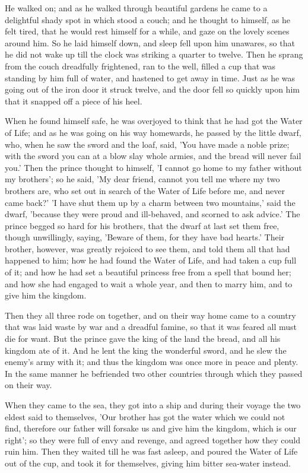 \documentclass[12pt]{book}
\begin{document}
He walked on; and as he walked through beautiful gardens he came to a
delightful shady spot in which stood a couch; and he thought to
himself, as he felt tired, that he would rest himself for a while, and
gaze on the lovely scenes around him. So he laid himself down, and
sleep fell upon him unawares, so that he did not wake up till the
clock was striking a quarter to twelve. Then he sprang from the couch
dreadfully frightened, ran to the well, filled a cup that was standing
by him full of water, and hastened to get away in time. Just as he was
going out of the iron door it struck twelve, and the door fell so
quickly upon him that it snapped off a piece of his heel.

When he found himself safe, he was overjoyed to think that he had got
the Water of Life; and as he was going on his way homewards, he passed
by the little dwarf, who, when he saw the sword and the loaf, said,
'You have made a noble prize; with the sword you can at a blow slay
whole armies, and the bread will never fail you.' Then the prince
thought to himself, 'I cannot go home to my father without my
brothers'; so he said, 'My dear friend, cannot you tell me where my
two brothers are, who set out in search of the Water of Life before
me, and never came back?' 'I have shut them up by a charm between two
mountains,' said the dwarf, 'because they were proud and ill-behaved,
and scorned to ask advice.' The prince begged so hard for his
brothers, that the dwarf at last set them free, though unwillingly,
saying, 'Beware of them, for they have bad hearts.' Their brother,
however, was greatly rejoiced to see them, and told them all that had
happened to him; how he had found the Water of Life, and had taken a
cup full of it; and how he had set a beautiful princess free from a
spell that bound her; and how she had engaged to wait a whole year,
and then to marry him, and to give him the kingdom.

Then they all three rode on together, and on their way home came to a
country that was laid waste by war and a dreadful famine, so that it
was feared all must die for want. But the prince gave the king of the
land the bread, and all his kingdom ate of it. And he lent the king
the wonderful sword, and he slew the enemy's army with it; and thus
the kingdom was once more in peace and plenty. In the same manner he
befriended two other countries through which they passed on their way.

When they came to the sea, they got into a ship and during their
voyage the two eldest said to themselves, 'Our brother has got the
water which we could not find, therefore our father will forsake us
and give him the kingdom, which is our right'; so they were full of
envy and revenge, and agreed together how they could ruin him. Then
they waited till he was fast asleep, and poured the Water of Life out
of the cup, and took it for themselves, giving him bitter sea-water
instead.
\end{document}
